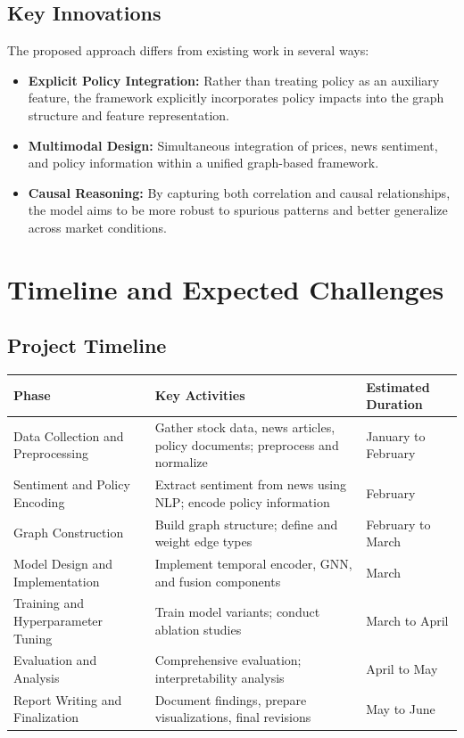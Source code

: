 \subsection{Key Innovations}

The proposed approach differs from existing work in several ways:

\begin{itemize}
    \item \textbf{Explicit Policy Integration:} Rather than treating policy as an auxiliary feature, the framework explicitly incorporates policy impacts into the graph structure and feature representation.
    
    \item \textbf{Multimodal Design:} Simultaneous integration of prices, news sentiment, and policy information within a unified graph-based framework.
    
    \item \textbf{Causal Reasoning:} By capturing both correlation and causal relationships, the model aims to be more robust to spurious patterns and better generalize across market conditions.
\end{itemize}

\section{Timeline and Expected Challenges}

\subsection{Project Timeline}

\begin{table}[h]
\centering
\begin{tabular}{|l|p{5cm}|p{4cm}|}
\hline
\textbf{Phase} & \textbf{Key Activities} & \textbf{Estimated Duration} \\
\hline
Data Collection and Preprocessing & Gather stock data, news articles, policy documents; preprocess and normalize & January to February \\
\hline
Sentiment and Policy Encoding & Extract sentiment from news using NLP; encode policy information & February \\
\hline
Graph Construction & Build graph structure; define and weight edge types & February to March \\
\hline
Model Design and Implementation & Implement temporal encoder, GNN, and fusion components & March \\
\hline
Training and Hyperparameter Tuning & Train model variants; conduct ablation studies & March to April \\
\hline
Evaluation and Analysis & Comprehensive evaluation; interpretability analysis & April to May \\
\hline
Report Writing and Finalization & Document findings, prepare visualizations, final revisions & May to June \\
\hline
\end{tabular}
\end{table}

